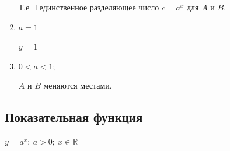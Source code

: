 \documentclass{article}
\begin{document}
\begin{enumerate}
            Т.е \(\exists\) единственное разделяющее число \(c = a^x\) для \(A\) и \(B\).

        \item \( a = 1\) 
        
            \( y = 1 \)     

        \item \( 0 < a < 1;\ \)
        
            \(A\) и \(B\) меняются местами.
    \end{enumerate}

    \subsection{Показательная функция}
    
    \( y = a^x;\ a > 0;\ x \in \mathbb{R} \)
\end{document}
